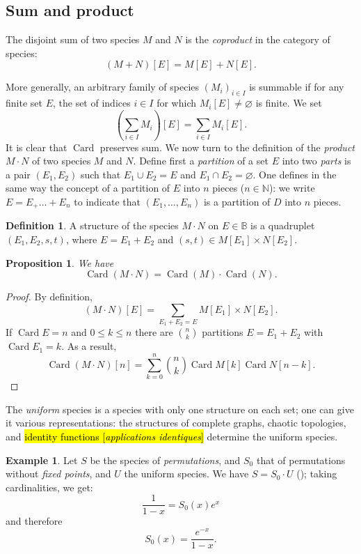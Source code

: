 \documentclass{amsart}
\newtheorem{prop}[thm]{Proposition}
\theoremstyle{definition}
\newtheorem{defn}[thm]{Definition}
\newtheorem{ex}{Example}
\theoremstyle{remark}
\newcommand{\trans}[2]{\hl{#1 [\textit{#2}]}}
\newcommand{\B}{\mathbb{B}}
\newcommand{\N}{\mathbb{N}}
\DeclareMathOperator{\Card}{Card}
\newcommand{\term}[1]{\emph{#1}}
\newcommand{\union}{\cup}
\newcommand{\intersect}{\cap}
\newcommand{\pref}[1]{\prettyref{#1}}
\begin{document}
\subsection{Sum and product}

The disjoint sum of two species $M$ and $N$ is the \emph{coproduct}
in the category of species:
\[ (M + N) [E] = M [E] + N [E]. \]

More generally, an arbitrary family of species $(M_i)_{i \in I}$ is
summable if for any finite set $E$, the set of indices $i \in I$ for
which $M_i[E] \neq \varnothing$ is finite.  We set
\[ \left( \sum_{i \in I} M_i \right) [ E ] = \sum_{i \in I} M_i[E]. \]
It is clear that $\Card$ preserves sum. We now turn to the definition
of the \term{product} $M \cdot N$ of two species $M$ and $N$. Define
first a \term{partition} of a set $E$ into two \term{parts} is a pair
$(E_1, E_2)$ such that $E_1 \union E_2 = E$ and $E_1 \intersect E_2 =
\varnothing$. One defines in the same way the concept of a partition
of $E$ into $n$ pieces ($n \in \N$): we write $E = E_ + \dots + E_n$
to indicate that $(E_1, \dots, E_n)$ is a partition of $D$ into $n$
pieces.

\begin{defn}
  A structure of the species $M \cdot N$ on $E \in \B$ is a quadruplet
  $(E_1, E_2, s, t)$, where $E = E_1 + E_2$ and $(s, t) \in M[E_1]
  \times N [E_2]$.
\end{defn}

\begin{prop}
We have
\[ \Card (M \cdot N) = \Card (M) \cdot \Card (N). \]
\end{prop}
\begin{proof}
By definition,
\[ (M \cdot N)[E] = \sum_{E_1 + E_2 = E} M[E_1] \times N[E_2]. \]
If $\Card E = n$ and $0 \leq k \leq n$ there are $\binom n k$
partitions $E = E_1 + E_2$ with $\Card E_1 = k$.  As a result,
\[ \Card(M \cdot N) [n] = \sum_{k=0}^n \binom n k \Card M [k] \Card N
[n - k]. \]
\end{proof}

The \term{uniform} species is a species with only one structure on
each set; one can give it various representations: the structures of
complete graphs, chaotic topologies, and \trans{identity
  functions}{applications identiques}
determine the uniform species.

\begin{ex}
  Let $S$ be the species of \term{permutations}, and $S_0$ that of
  permutations without \emph{fixed points}, and $U$ the uniform
  species. We have $S = S_0 \cdot U$ (\pref{fig:permutation}); taking
  cardinalities, we get:
\[ \frac{1}{1-x} = S_0 (x) e^x \]
and therefore
\[ S_0 (x) = \frac{e^{-x}}{1 - x}. \]
\end{ex}
\end{document}
